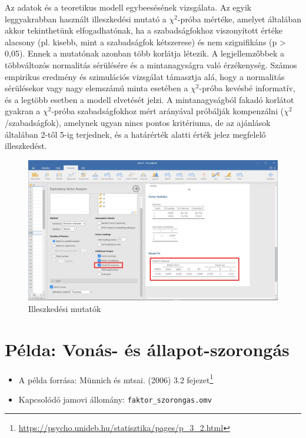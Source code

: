 \documentclass[
  letterpaper,
]{krantz}
\providecommand{\tightlist}{%
  \setlength{\itemsep}{0pt}\setlength{\parskip}{0pt}}\usepackage{longtable,booktabs,array}
\renewcommand{\href}[2]{#2\footnote{\url{#1}}}
\begin{document}
Az adatok és a teoretikus modell egybeesésének vizsgálata. Az egyik
leggyakrabban használt illeszkedési mutató a \(\chi^2\)-próba mértéke,
amelyet általában akkor tekinthetünk elfogadhatónak, ha a
szabadságfokhoz viszonyított értéke alacsony (pl. kisebb, mint a
szabadságfok kétszerese) és nem szignifikáns (p \textgreater{} 0,05).
Ennek a mutatónak azonban több korlátja létezik. A legjellemzőbbek a
többváltozós normalitás sérülésére és a mintanagyságra való érzékenység.
Számos empirikus eredmény és szimulációs vizsgálat támasztja alá, hogy a
normalitás sérülésekor vagy nagy elemszámú minta esetében a
\(\chi^2\)-próba kevésbé informatív, és a legtöbb esetben a modell
elvetését jelzi. A mintanagyságból fakadó korlátot gyakran a
\(\chi^2\)-próba szabadságfokhoz mért arányával próbálják kompenzálni
(\(\chi^2\)/szabadságfok), amelynek ugyan nincs pontos kritériuma, de az
ajánlások általában 2-től 5-ig terjednek, és a határérték alatti érték
jelez megfelelő illeszkedést.

\begin{figure}

{\centering \includegraphics{./images/efa_fogkrem_05.jpg}

}

\caption{Illeszkedési mutatók}

\end{figure}

\hypertarget{puxe9lda-vonuxe1s--uxe9s-uxe1llapot-szoronguxe1s}{%
\section{Példa: Vonás- és
állapot-szorongás}\label{puxe9lda-vonuxe1s--uxe9s-uxe1llapot-szoronguxe1s}}

\begin{itemize}
\tightlist
\item
  A példa forrása: Münnich és mtsai. (2006)
  \href{https://psycho.unideb.hu/statisztika/pages/p_3_2.html}{3.2
  fejezet}
\item
  Kapcsolódó jamovi állomány: \texttt{faktor\_szorongas.omv}
\end{itemize}
\end{document}

